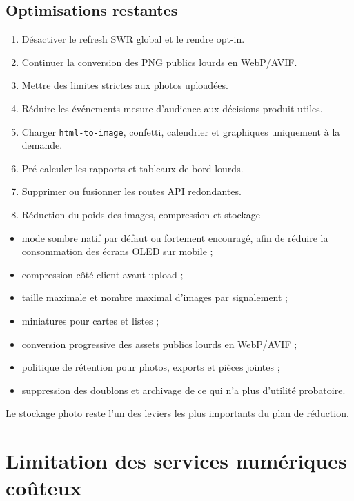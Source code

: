 \documentclass[
  10pt,
  a4paper,
  DIV=11,
  numbers=noendperiod,
  oneside]{scrreprt}
\providecommand{\tightlist}{%
  \setlength{\itemsep}{0pt}\setlength{\parskip}{0pt}}
\begin{document}
\subsection{Optimisations restantes}\label{optimisations-restantes}

\begin{enumerate}
\def\labelenumi{\arabic{enumi}.}
\tightlist
\item
  Désactiver le refresh SWR global et le rendre opt-in.
\item
  Continuer la conversion des PNG publics lourds en WebP/AVIF.
\item
  Mettre des limites strictes aux photos uploadées.
\item
  Réduire les événements mesure d'audience aux décisions produit utiles.
\item
  Charger \texttt{html-to-image}, confetti, calendrier et graphiques
  uniquement à la demande.
\item
  Pré-calculer les rapports et tableaux de bord lourds.
\item
  Supprimer ou fusionner les routes API redondantes.
\item
  Réduction du poids des images, compression et stockage
\end{enumerate}

\begin{itemize}
\tightlist
\item
  mode sombre natif par défaut ou fortement encouragé, afin de réduire
  la consommation des écrans OLED sur mobile ;
\item
  compression côté client avant upload ;
\item
  taille maximale et nombre maximal d'images par signalement ;
\item
  miniatures pour cartes et listes ;
\item
  conversion progressive des assets publics lourds en WebP/AVIF ;
\item
  politique de rétention pour photos, exports et pièces jointes ;
\item
  suppression des doublons et archivage de ce qui n'a plus d'utilité
  probatoire.
\end{itemize}

Le stockage photo reste l'un des leviers les plus importants du plan de
réduction.

\section{Limitation des services numériques
coûteux}\label{limitation-des-services-numuxe9riques-couxfbteux}
\end{document}
